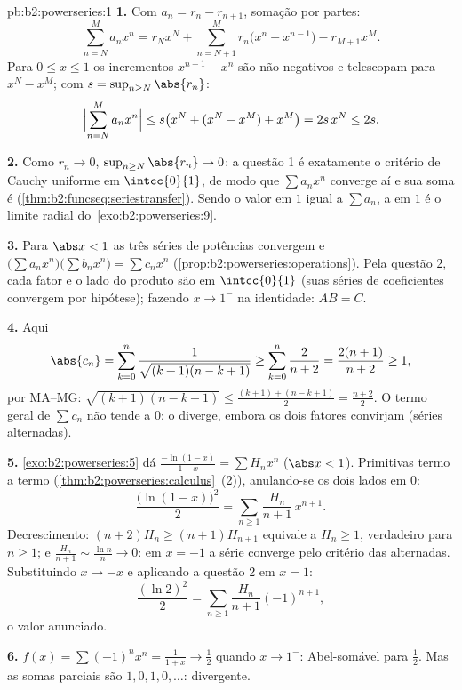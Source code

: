 \begin{solution}{pb:b2:powerseries:1}
\textbf{1.} Com $a_n = r_n - r_{n+1}$, somação por partes:
\[
\sum_{n=N}^{M} a_nx^n
= r_Nx^N + \sum_{n=N+1}^{M} r_n\bigl(x^n - x^{n-1}\bigr)
- r_{M+1}x^M .
\]
Para $0 \leq x \leq 1$ os incrementos $x^{n-1} - x^n$ são
não negativos e telescopam para $x^N - x^M$; com $s = \sup_{n\geq
N}\abs{r_n}$:
\[
\Bigl|\sum_{n=N}^{M}a_nx^n\Bigr|
\leq s\bigl(x^N + (x^N - x^M) + x^M\bigr) = 2s\,x^N \leq 2s .
\]

\textbf{2.} Como $r_n \to 0$, $\sup_{n\geq N}\abs{r_n} \to 0$:
a questão 1 é exatamente o critério de Cauchy uniforme em
$\intcc{0}{1}$, de modo que $\sum a_nx^n$ converge  aí e
sua soma é  (\cref{thm:b2:funcseq:seriestransfer}).
Sendo o valor em $1$ igual a $\sum a_n$, a  em $1$ é o
limite radial do~\cref{exo:b2:powerseries:9}.

\textbf{3.} Para $\abs x < 1$ as três séries de potências convergem
 e $\bigl(\sum a_nx^n\bigr)\bigl(\sum b_nx^n\bigr)
= \sum c_nx^n$ (\cref{prop:b2:powerseries:operations}). Pela
questão 2, cada fator e o lado do produto são  em
$\intcc{0}{1}$ (suas séries de coeficientes convergem por
hipótese); fazendo $x \to 1^-$ na identidade: $AB = C$.

\textbf{4.} Aqui
\[
\abs{c_n} = \sum_{k=0}^{n}
\frac{1}{\sqrt{(k+1)(n-k+1)}}
\geq \sum_{k=0}^{n}\frac{2}{n+2}
= \frac{2(n+1)}{n+2} \geq 1,
\]
por MA--MG: $\sqrt{(k+1)(n-k+1)} \leq \frac{(k+1) +
(n-k+1)}{2} = \frac{n+2}{2}$. O termo geral de $\sum c_n$
não tende a $0$: o  diverge, embora
os dois fatores convirjam (séries alternadas).

\textbf{5.} \cref{exo:b2:powerseries:5} dá
$\frac{-\ln(1-x)}{1-x} = \sum H_nx^n$ ($\abs x < 1$).
Primitivas termo a termo
(\cref{thm:b2:powerseries:calculus}~(2)), anulando-se os dois lados
em $0$:
\[
\frac{\bigl(\ln(1-x)\bigr)^2}{2}
= \sum_{n\geq1}\frac{H_n}{n+1}\,x^{n+1} .
\]
Decrescimento: $(n+2)H_n \geq (n+1)H_{n+1}$ equivale a $H_n \geq
1$, verdadeiro para $n \geq 1$; e $\frac{H_n}{n+1} \sim \frac{\ln
n}{n} \to 0$: em $x = -1$ a série converge pelo
critério das alternadas. Substituindo $x \mapsto -x$ e aplicando a
questão 2 em $x = 1$:
\[
\frac{(\ln 2)^2}{2}
= \sum_{n\geq1}\frac{H_n}{n+1}(-1)^{n+1},
\]
o valor anunciado.

\textbf{6.} $f(x) = \sum(-1)^nx^n = \frac{1}{1+x} \to \frac12$
quando $x \to 1^-$: Abel-somável para $\frac12$. Mas as somas
parciais são $1, 0, 1, 0, \dots$: divergente.


\end{solution}
